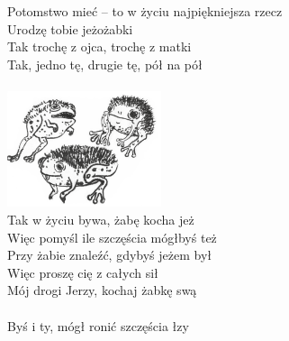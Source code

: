 \documentclass[a5paper, 10pt]{book}
\begin{document}
\begin{minipage}[t]{0.8\textwidth}
\hspace*{5mm}Potomstwo mieć – to w życiu najpiękniejsza rzecz\\
\hspace*{5mm}Urodzę tobie jeżożabki\\
\hspace*{5mm}Tak trochę z ojca, trochę z matki\\
\hspace*{5mm}Tak, jedno tę, drugie tę, pół na pół\\
\\
\includegraphics[height=3.4cm, right]{images/jezozabki.png}\vspace*{-3.4cm}\\
Tak w życiu bywa, żabę kocha jeż\\
Więc pomyśl ile szczęścia mógłbyś też\\
Przy żabie znaleźć, gdybyś jeżem był\\
Więc proszę cię z całych sił\\
Mój drogi Jerzy, kochaj żabkę swą\\
\\
Byś i ty, mógł ronić szczęścia łzy\\
\end{minipage}
\end{document}
